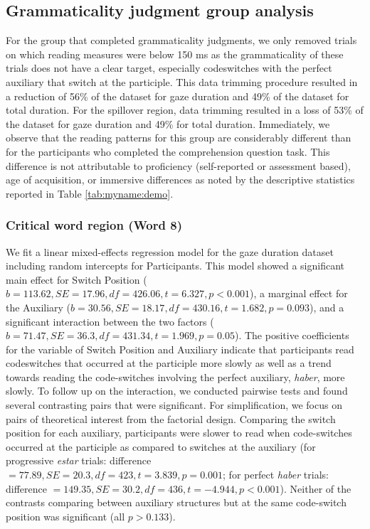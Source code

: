 \documentclass[output=paper,colorlinks,citecolor=brown]{langscibook}
\begin{document}
\subsection{Grammaticality judgment group analysis}
For the group that completed grammaticality judgments, we only removed trials on which reading measures were below 150 ms as the grammaticality of these trials does not have a clear target, especially codeswitches with the perfect auxiliary that switch at the participle. This data trimming procedure resulted in a reduction of 56\% of the dataset for gaze duration and 49\% of the dataset for total duration. For the spillover region, data trimming resulted in a loss of 53\% of the dataset for gaze duration and 49\% for total duration. Immediately, we observe that the reading patterns for this group are considerably different than for the participants who completed the comprehension question task. This difference is not attributable to proficiency (self-reported or assessment based), age of acquisition, or immersive differences as noted by the descriptive statistics reported in Table \ref{tab:myname:demo}.

\subsubsection{Critical word region (Word 8)}
We fit a linear mixed-effects regression model for the gaze duration dataset including random intercepts for Participants. This model showed a significant main effect for Switch Position ($b = 113.62, SE = 17.96, df = 426.06, t = 6.327, p < 0.001$), a marginal effect for the Auxiliary ($b = 30.56, SE = 18.17, df = 430.16, t = 1.682, p = 0.093$), and a significant interaction between the two factors ($b = 71.47, SE = 36.3, df = 431.34, t = 1.969, p = 0.05$). The positive coefficients for the variable of Switch Position and Auxiliary indicate that participants read codeswitches that occurred at the participle more slowly as well as a trend towards reading the code-switches involving the perfect auxiliary, \textit{haber}, more slowly. To follow up on the interaction, we conducted pairwise tests and found several contrasting pairs that were significant. For simplification, we focus on pairs of theoretical interest from the factorial design. Comparing the switch position for each auxiliary, participants were slower to read when code-switches occurred at the participle as compared to switches at the auxiliary (for progressive \textit{estar} trials: difference $= 77.89, SE = 20.3, df = 423, t = 3.839, p = 0.001$; for perfect \textit{haber} trials: difference $= 149.35, SE = 30.2, df = 436, t = -4.944, p < 0.001$). Neither of the contrasts comparing between auxiliary structures but at the same code-switch position was significant (all $p > 0.133$).
\end{document}
